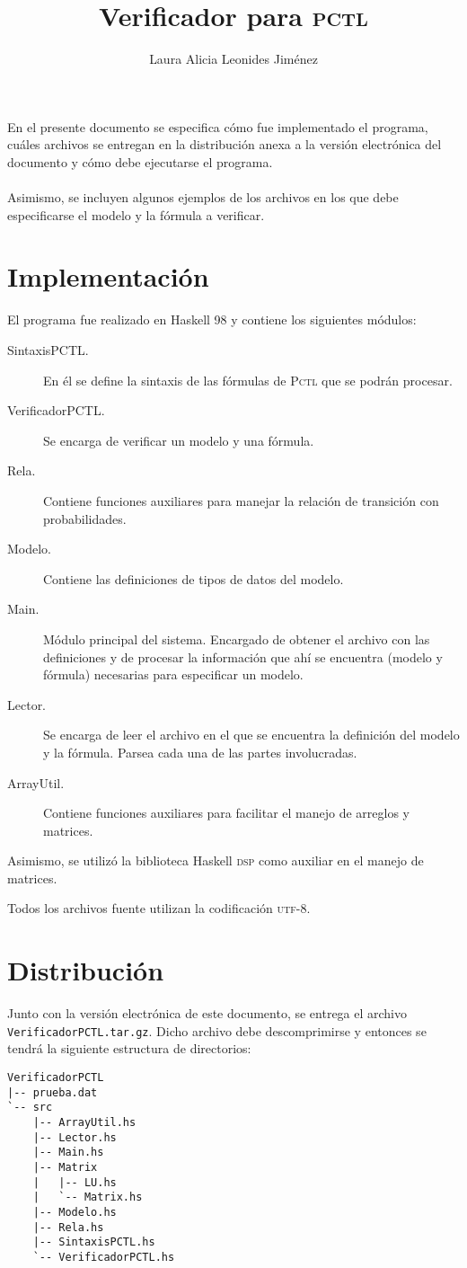 \documentclass[12pt,letterpaper,spanish]{article}
\author{Laura Alicia Leonides Jiménez}
\title{Verificador para \textsc{pctl}}
\date{ }
\begin{document}
\maketitle

En el presente documento se especifica cómo fue implementado el programa, cuáles archivos
se entregan en la distribución anexa a la versión electrónica del documento y cómo debe
ejecutarse el programa.
\\\\
Asimismo, se incluyen algunos ejemplos de los archivos en los que debe especificarse el modelo
y la fórmula a verificar.

\section{Implementación}
El programa fue realizado en Haskell 98 y contiene los siguientes módulos:
\begin{description}
 \item [SintaxisPCTL.] En él se define la sintaxis de las
fórmulas de \textsc{Pctl} que se podrán procesar.
 \item [VerificadorPCTL.] Se encarga de verificar un modelo y una fórmula.
 \item [Rela.] Contiene funciones auxiliares para manejar la relación de transición  con 
probabilidades.
 \item [Modelo.] Contiene las definiciones de tipos de datos del modelo.
 \item [Main.] Módulo principal del sistema. Encargado de obtener el archivo
con las definiciones y de procesar la información que ahí se encuentra (modelo y fórmula)
necesarias para especificar un modelo.
 \item [Lector.] Se encarga de leer el archivo en el que se encuentra
la definición del modelo y la fórmula. Parsea cada una de las partes involucradas.
 \item [ArrayUtil.] Contiene funciones auxiliares para facilitar el manejo de arreglos
y matrices.
\end{description}

Asimismo, se utilizó la biblioteca Haskell \textsc{dsp} como auxiliar en el manejo de matrices.

Todos los archivos fuente utilizan la codificación \textsc{utf}-8.

\section{Distribución}
Junto con la versión electrónica de este documento, se entrega el archivo \texttt{VerificadorPCTL.tar.gz}.
Dicho archivo debe descomprimirse y entonces se tendrá la siguiente estructura de directorios:
\begin{verbatim}
VerificadorPCTL
|-- prueba.dat
`-- src
    |-- ArrayUtil.hs
    |-- Lector.hs
    |-- Main.hs
    |-- Matrix
    |   |-- LU.hs
    |   `-- Matrix.hs
    |-- Modelo.hs
    |-- Rela.hs
    |-- SintaxisPCTL.hs
    `-- VerificadorPCTL.hs

\end{verbatim}
\end{document}
